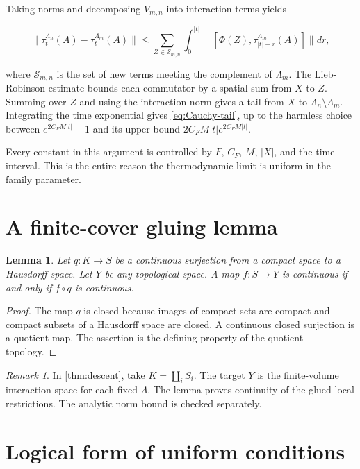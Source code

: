 \documentclass[12pt]{article}
\newtheorem{lemma}[theorem]{Lemma}
\theoremstyle{definition}
\theoremstyle{remark}
\newtheorem{remark}[theorem]{Remark}
\begin{document}
Taking norms and decomposing $V_{m,n}$ into interaction terms yields

\begin{equation}
 \|\tau_t^{\Lambda_n}(A)-\tau_t^{\Lambda_m}(A)\|
 \le
 \sum_{Z\in\mathcal S_{m,n}}
 \int_0^{|t|}
 \|[\Phi(Z),\tau_{|t|-r}^{\Lambda_m}(A)]\|dr,
\end{equation}

where $\mathcal S_{m,n}$ is the set of new terms meeting the complement of
$\Lambda_m$.  The Lieb-Robinson estimate bounds each commutator by a spatial
sum from $X$ to $Z$.  Summing over $Z$ and using the interaction norm gives a
tail from $X$ to $\Lambda_n\setminus\Lambda_m$.  Integrating the time
exponential gives \cref{eq:Cauchy-tail}, up to the harmless choice between
$e^{2C_FM|t|}-1$ and its upper bound
$2C_FM|t|e^{2C_FM|t|}$.

Every constant in this argument is controlled by $F$, $C_F$, $M$, $|X|$,
and the time interval.  This is the entire reason the thermodynamic limit is
uniform in the family parameter.

\section{A finite-cover gluing lemma}

\begin{lemma}
Let $q:K\to S$ be a continuous surjection from a compact space to a Hausdorff
space.  Let $Y$ be any topological space.  A map $f:S\to Y$ is continuous if
and only if $f\circ q$ is continuous.
\end{lemma}

\begin{proof}
The map $q$ is closed because images of compact sets are compact and compact
subsets of a Hausdorff space are closed.  A continuous closed surjection is a
quotient map.  The assertion is the defining property of the quotient
topology.
\end{proof}

\begin{remark}
In \cref{thm:descent}, take $K=\coprod_iS_i$.  The target $Y$ is the
finite-volume interaction space for each fixed $\Lambda$.  The lemma proves
continuity of the glued local restrictions.  The analytic norm bound is
checked separately.
\end{remark}

\section{Logical form of uniform conditions}
\end{document}

